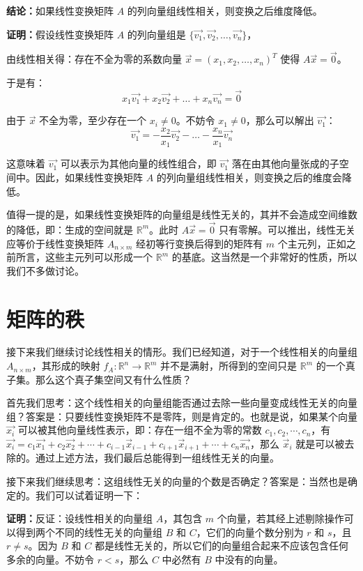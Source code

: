 \documentclass[b5paper]{ctexart}
\newcommand{\R}{\mathbb{R}}
\begin{document}
	\vspace{12pt}
	
	
	\textbf{结论：}如果线性变换矩阵 $A$ 的列向量组线性相关，则变换之后维度降低。
	
	\textbf{证明：}假设线性变换矩阵 $A$ 的列向量组是 $\{\vec{v_1}, \vec{v_2}, \ldots, \vec{v_n}\}$，
	
	由线性相关得：存在不全为零的系数向量 $\vec{x} = (x_1, x_2, \ldots, x_n)^T$ 使得 $A\vec{x} = \vec{0}$。
	
	于是有：
	\[ x_1 \vec{v_1} + x_2 \vec{v_2} + \ldots + x_n \vec{v_n} = \vec{0} \]
	
	由于 $\vec{x}$ 不全为零，至少存在一个 $x_i \neq 0$。不妨令 $x_1 \neq 0$，那么可以解出 $\vec{v_1}$：
	\[ \vec{v_1} = -\frac{x_2}{x_1} \vec{v_2} - \ldots - \frac{x_n}{x_1} \vec{v_n} \]
	
	这意味着 $\vec{v_1}$ 可以表示为其他向量的线性组合，即 $\vec{v_1}$ 落在由其他向量张成的子空间中。因此，如果线性变换矩阵 $A$ 的列向量组线性相关，则变换之后的维度会降低。
	
	值得一提的是，如果线性变换矩阵的向量组是线性无关的，其并不会造成空间维数的降低，即：生成的空间就是 $\R^m$。此时 $A\vec{x} = \vec{0}$ 只有零解。可以推出，线性无关应等价于线性变换矩阵 $A_{n \times m}$ 经初等行变换后得到的矩阵有 $m$ 个主元列，正如之前所言，这些主元列可以形成一个 $\R^m$ 的基底。这当然是一个非常好的性质，所以我们不多做讨论。
	
	\newpage
	\section{矩阵的秩}
	接下来我们继续讨论线性相关的情形。我们已经知道，对于一个线性相关的向量组 $A_{n \times m}$，其形成的映射 $f_{A}: \R^n \to \R^m$ 并不是满射，所得到的空间只是 $\R^m$ 的一个真子集。那么这个真子集空间又有什么性质？
	
	首先我们思考：这个线性相关的向量组能否通过去除一些向量变成线性无关的向量组？答案是：只要线性变换矩阵不是零阵，则是肯定的。也就是说，如果某个向量 $\vec{x_i}$ 可以被其他向量线性表示，即：存在一组不全为零的常数 $c_1, c_2, \cdots, c_n$，有 $\vec{x_i} = c_1\vec{x_1} + c_2\vec{x_2} + \cdots + c_{i - 1}\vec{x}_{i - 1} + c_{i +1}\vec{x}_{i +1} + \cdots + c_n\vec{x_n}$，那么 $\vec{x}_i$ 就是可以被去除的。通过上述方法，我们最后总能得到一组线性无关的向量。
	
	接下来我们继续思考：这组线性无关的向量的个数是否确定？答案是：当然也是确定的。我们可以试着证明一下：
	
	\textbf{证明：}反证：设线性相关的向量组 $A$，其包含 $m$ 个向量，若其经上述剔除操作可以得到两个不同的线性无关的向量组 $B$ 和 $C$，它们的向量个数分别为 $r$ 和 $s$，且 $r \neq s$。因为 $B$ 和 $C$ 都是线性无关的，所以它们的向量组合起来不应该包含任何多余的向量。不妨令 $r < s$，那么 $C$ 中必然有 $B$ 中没有的向量。
	
\end{document}
